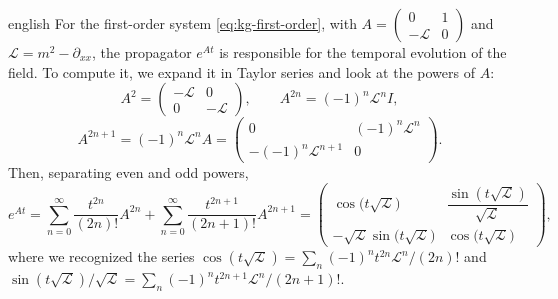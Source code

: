 \begin{hyphenrules}{english}
For the first-order system \eqref{eq:kg-first-order}, with $A=\begin{pmatrix}0&1\\-\mathcal{L}&0\end{pmatrix}$
and $\mathcal{L}=m^2-\partial_{xx}$, the propagator $e^{At}$ is responsible for the temporal evolution of
the field. To compute it, we expand it in Taylor series and look at the powers of $A$:
\[
  A^2=\begin{pmatrix}-\mathcal{L} & 0\\ 0 & -\mathcal{L}\end{pmatrix},\qquad
  A^{2n}=(-1)^n\mathcal{L}^{n}I,
\]
\[
  A^{2n+1}=(-1)^n\mathcal{L}^{n}A=\begin{pmatrix}0 & (-1)^n\mathcal{L}^{n}\\ -(-1)^n\mathcal{L}^{n+1} & 0\end{pmatrix}.
\]
Then, separating even and odd powers,
\begin{equation}
  e^{At}=\sum_{n=0}^{\infty}\frac{t^{2n}}{(2n)!}A^{2n}+\sum_{n=0}^{\infty}\frac{t^{2n+1}}{(2n+1)!}A^{2n+1}
  =\begin{pmatrix}
    \cos\big(t\sqrt{\mathcal{L}}\big) & \dfrac{\sin(t\sqrt{\mathcal{L}})}{\sqrt{\mathcal{L}}}\\[2mm]
    -\sqrt{\mathcal{L}}\sin\big(t\sqrt{\mathcal{L}}\big) & \cos\big(t\sqrt{\mathcal{L}}\big)
  \end{pmatrix},
  \label{eq:app-kg-propagator}
\end{equation}
where we recognized the series
$\cos(t\sqrt{\mathcal{L}})=\sum_n(-1)^nt^{2n}\mathcal{L}^n/(2n)!$ and
$\sin(t\sqrt{\mathcal{L}})/\sqrt{\mathcal{L}}=\sum_n(-1)^nt^{2n+1}\mathcal{L}^n/(2n+1)!$.

\end{hyphenrules}
